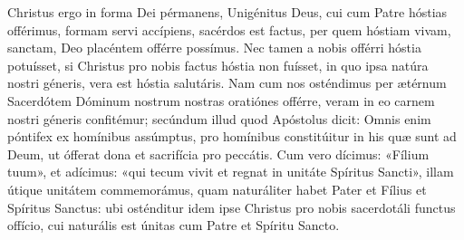 {\noindent Christus ergo in forma Dei pérmanens, Unigénitus Deus, cui cum Patre hóstias offérimus, formam servi accípiens, sacérdos est factus, per quem hóstiam vivam, sanctam, Deo placéntem offérre possímus. Nec tamen a nobis offérri hóstia potuísset, si Christus pro nobis factus hóstia non fuísset, in quo ipsa natúra nostri géneris, vera est hóstia salutáris. {\color{gray} Nam cum nos osténdimus per ætérnum Sacerdótem Dóminum nostrum nostras oratiónes offérre, veram in eo carnem nostri géneris confitémur; secúndum illud quod Apóstolus dicit: \emph{} Omnis enim póntifex ex homínibus assúmptus, pro homínibus constitúitur in his quæ sunt ad Deum, ut ófferat dona et sacrifícia pro peccátis. Cum vero dícimus: «Fílium tuum», et adícimus: «qui tecum vivit et regnat in unitáte Spíritus Sancti», illam útique unitátem commemorámus, quam naturáliter habet Pater et Fílius et Spíritus Sanctus: ubi osténditur idem ipse Christus pro nobis sacerdotáli functus offício, cui naturális est únitas cum Patre et Spíritu Sancto.}}
\newcommand{\responsoriumiii}{\pars{Responsorium 3.} \scriptura{\Rbardot{} Dt. 27, 2; \textbf{H161}}

\vspace{-5mm}

\responsorium{VII}{temporalia/resp-vosquitransituriestis-CROCHU-cumdox.gtex}{}

\rubrica{vel ad libitum:}

\vspace{3mm}

\pars{Responsorium 3.} \scriptura{\Rbardot{} Ps. 76, 6 \Vbardot{} ibid., 19; \textbf{H88}}

\vspace{-5mm}

\responsorium{VII}{temporalia/resp-cogitavidiesantiquos-CROCHU-cumdox.gtex}{}}


